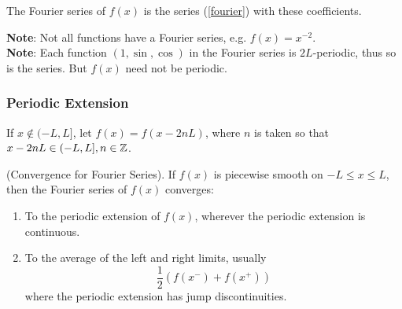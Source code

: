 \documentclass{article}
\begin{document}
	\begin{define}
		The Fourier series of $ f(x) $ is the series (\ref{fourier}) with these coefficients. 
	\end{define}

	\textbf{Note}: Not all functions have a Fourier series, e.g. $ f(x) = x^{-2} $.  \\
	
	\textbf{Note}: Each function $ (1, \sin, \cos) $ in the Fourier series is $ 2L $-periodic, thus so is the series. But $ f(x) $ need not be periodic.
	
	\subsubsection*{Periodic Extension}
	
	If $ x \notin (-L,L] $, let $ f(x) = f(x-2nL) $, where $ n $ is taken so that $ x-2nL \in (-L,L], n \in \mathbb{Z} $.
	
	\begin{center}
	\end{center}
	
	\begin{thm}{(Convergence for Fourier Series).}
		If $ f(x) $ is piecewise smooth on $ -L \leq x \leq L $, then the Fourier series of $ f(x) $ converges: 
		\begin{enumerate}[label=\arabic*.)]
			\item To the periodic extension of $ f(x) $, wherever the periodic extension is continuous. 
			\item To the average of the left and right limits, usually 
			\[
				\frac{1}{2} (f(x^-) + f(x^+))
			\]
			where the periodic extension has jump discontinuities.
		\end{enumerate}
	\end{thm}
	
\end{document}
